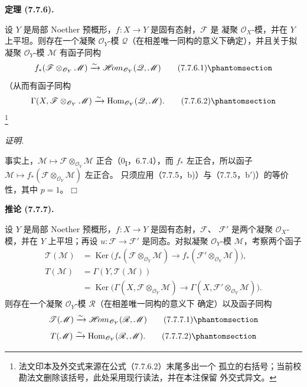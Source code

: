 \documentclass[UTF8,fontset=none,11pt,oneside,openany]{ctexbook}
\providecommand{\square}{\mdlgwhtsquare}
\newcommand{\SourceCorrectionNote}[1]{\footnote{#1}}
\newenvironment{theorem}[1][]{%
  \par\medskip\noindent\textbf{定理 (#1).}\ %
}{\par}
\newenvironment{corollary}[1][]{%
  \par\medskip\noindent\textbf{推论 (#1).}\ %
}{\par}
\newenvironment{proof}{%
  \par\smallskip\noindent\textit{证明.}\ %
}{\hfill$\square$\par}
\let\EGAOriginalLabel\label
\renewcommand{\label}[1]{\phantomsection\EGAOriginalLabel{#1}}
\begin{document}
\begin{theorem}[7.7.6]
设 $Y$ 是局部 Noether 预概形，$f:X\to Y$ 是固有态射，$\mathscr F$ 是
凝聚 $\mathscr O_X$-模，并在 $Y$ 上平坦。则存在一个凝聚 $\mathscr O_Y$-模
$\mathscr Q$（在相差唯一同构的意义下确定），并且关于拟凝聚
$\mathscr O_Y$-模 $\mathscr M$ 有函子同构
\[
  f_*(\mathscr F\otimes_{\mathscr O_Y}\mathscr M)
  \xrightarrow{\sim}
  \mathscr{H}\!om_{\mathscr O_Y}(\mathscr Q,\mathscr M)
  \tag{7.7.6.1}\label{III.7.7.6.1.fr}
\]
（从而有函子同构
\[
  \Gamma(X,\mathscr F\otimes_{\mathscr O_Y}\mathscr M)
  \xrightarrow{\sim}
  \operatorname{Hom}_{\mathscr O_Y}(\mathscr Q,\mathscr M).
  \tag{7.7.6.2}\label{III.7.7.6.2.fr}
\]
\SourceCorrectionNote{法文印本及外交式来源在公式（7.7.6.2）末尾多出一个
孤立的右括号；当前校勘法文删除该括号，此处采用现行读法，并在本注保留
外交式异文。}
\end{theorem}

\begin{proof}
事实上，$\mathscr M\mapsto\mathscr F\otimes_{\mathscr O_Y}\mathscr M$
正合（0\textsubscript{I}，6.7.4），而 $f_*$ 左正合，所以函子
$\mathscr M\mapsto f_*(\mathscr F\otimes_{\mathscr O_Y}\mathscr M)$ 左正合。
只须应用（7.7.5，b)）与（7.7.5，b$'$)）的等价性，其中 $p=1$。
\end{proof}

\begin{corollary}[7.7.7]
设 $Y$ 是局部 Noether 预概形，$f:X\to Y$ 是固有态射，$\mathscr F$、
$\mathscr F'$ 是两个凝聚 $\mathscr O_X$-模，并在 $Y$ 上平坦；再设
$u:\mathscr F\to\mathscr F'$ 是同态。对拟凝聚 $\mathscr O_Y$-模
$\mathscr M$，考察两个函子
\begin{align*}
  \mathscr T(\mathscr M)
  &=
  \operatorname{Ker}
  \bigl(
    f_*(\mathscr F\otimes_{\mathscr O_Y}\mathscr M)
    \longrightarrow
    f_*(\mathscr F'\otimes_{\mathscr O_Y}\mathscr M)
  \bigr),\\
  T(\mathscr M)
  &=
  \Gamma(Y,\mathscr T(\mathscr M))\\
  &=
  \operatorname{Ker}
  \bigl(
    \Gamma(X,\mathscr F\otimes_{\mathscr O_Y}\mathscr M)
    \longrightarrow
    \Gamma(X,\mathscr F'\otimes_{\mathscr O_Y}\mathscr M)
  \bigr).
\end{align*}
则存在一个凝聚 $\mathscr O_Y$-模 $\mathscr R$（在相差唯一同构的意义下
确定）以及函子同构
\[
  \mathscr T(\mathscr M)
  \xrightarrow{\sim}
  \mathscr{H}\!om_{\mathscr O_Y}(\mathscr R,\mathscr M)
  \tag{7.7.7.1}\label{III.7.7.7.1.fr}
\]
\[
  T(\mathscr M)
  \xrightarrow{\sim}
  \operatorname{Hom}_{\mathscr O_Y}(\mathscr R,\mathscr M).
  \tag{7.7.7.2}\label{III.7.7.7.2.fr}
\]
\end{corollary}
\end{document}
